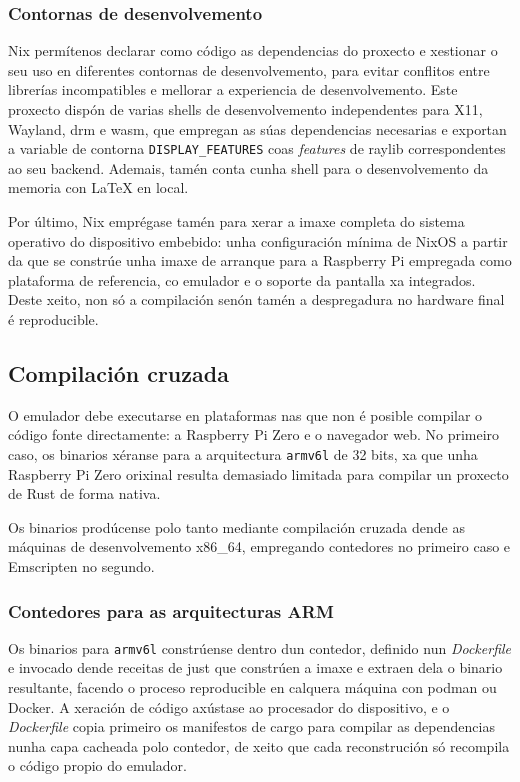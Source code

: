 \subsubsection{Contornas de desenvolvemento}

Nix permítenos declarar como código as dependencias do proxecto
e xestionar o seu uso en diferentes contornas de desenvolvemento,
para evitar conflitos entre librerías incompatibles e mellorar a experiencia de desenvolvemento.
Este proxecto dispón de varias shells de desenvolvemento independentes para X11, Wayland, \acrshort{drm} e \acrshort{wasm},
que empregan as súas dependencias necesarias e exportan a variable de contorna \texttt{DISPLAY\_FEATURES} coas \textit{features} de raylib correspondentes ao seu backend.
Ademais, tamén conta cunha shell para o desenvolvemento da memoria con \LaTeX{} en local.

Por último, Nix emprégase tamén para xerar a imaxe completa do sistema operativo do dispositivo embebido:
unha configuración mínima de NixOS a partir da que se constrúe unha imaxe de arranque
para a Raspberry Pi empregada como plataforma de referencia, co emulador e o soporte da pantalla xa integrados.
Deste xeito, non só a compilación senón tamén a despregadura no hardware final é reproducible.

\subsection{Compilación cruzada}
O emulador debe executarse en plataformas nas que non é posible compilar o código fonte directamente:
a Raspberry Pi Zero e o navegador web.
No primeiro caso, os binarios xéranse para a arquitectura \texttt{armv6l} de 32 bits,
xa que unha Raspberry Pi Zero orixinal resulta demasiado limitada
para compilar un proxecto de Rust de forma nativa.

Os binarios prodúcense polo tanto mediante compilación cruzada
dende as máquinas de desenvolvemento x86\_64,
empregando contedores no primeiro caso e Emscripten no segundo.

\subsubsection{Contedores para as arquitecturas ARM}
Os binarios para \texttt{armv6l} constrúense dentro dun contedor,
definido nun \textit{Dockerfile} e invocado dende receitas de just
que constrúen a imaxe e extraen dela o binario resultante,
facendo o proceso reproducible en calquera máquina con podman ou Docker.
A xeración de código axústase ao procesador do dispositivo,
e o \textit{Dockerfile} copia primeiro os manifestos de cargo
para compilar as dependencias nunha capa cacheada polo contedor,
de xeito que cada reconstrución só recompila o código propio do emulador.

